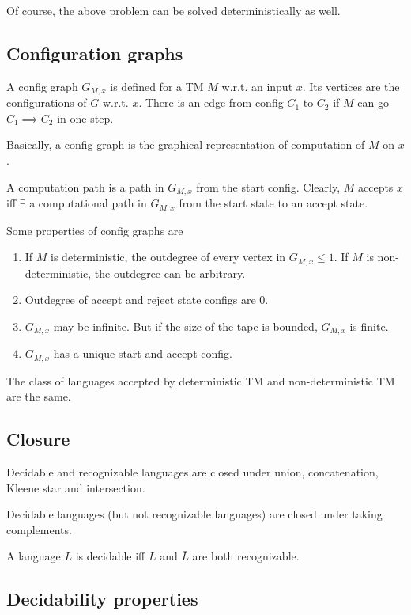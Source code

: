 \documentclass{article}
\begin{document}
Of course, the above problem can be solved deterministically as well.

\subsection{Configuration graphs}

A config graph $G_{M,x}$  is defined for a TM $M$ w.r.t. an input $x$. Its vertices are the configurations of $G$ w.r.t. $x$. There is an edge from config $C_1$ to $C_2$ if $M$ can go $C_1 \implies C_2$ in one step.

Basically, a config graph is the graphical representation of computation of $M$ on $x$.

A computation path is a path in $G_{M,x}$ from the start config. Clearly, $M$ accepts $x$ iff $\exists$ a computational path in $G_{M,x}$ from the start state to an accept state.

Some properties of config graphs are 
\begin{enumerate}
\item\label{item:60} If $M$ is deterministic, the outdegree of every vertex in $G_{M,x} \leq 1$. If $M$ is non-deterministic, the outdegree can be arbitrary. 
\item\label{item:61} Outdegree of accept and reject state configs are $0$. 
\item\label{item:62} $G_{M,x}$ may be infinite. But if the size of the tape is bounded, $G_{M,x}$ is finite. 
\item\label{item:63} $G_{M,x}$ has a unique start and accept config.
\end{enumerate}

The class of languages accepted by deterministic TM and non-deterministic TM are the same.

\subsection{Closure}

Decidable and recognizable languages are closed under union, concatenation, Kleene star and intersection.

Decidable languages (but not recognizable languages) are closed under taking complements.

A language $L$ is decidable iff $L$ and $\bar{L}$ are both recognizable.

\subsection{Decidability properties}
\end{document}

